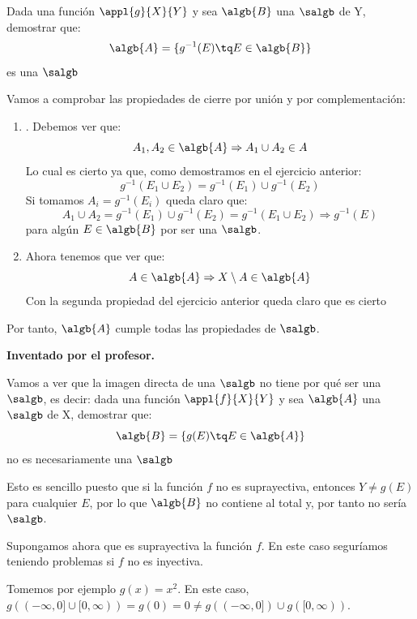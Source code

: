 \begin{problem}[5]
Dada una función $\appl{g}{X}{Y}$ y sea $\algb{B}$ una $\salgb$ de Y, demostrar que:
\[\algb{A}=\{g^{-1}(E) \tq E \in \algb{B}\}\]
es una $\salgb$

\solution
Vamos a comprobar las propiedades de cierre por unión y por complementación:
\begin{enumerate}
\item. Debemos ver que:
\[A_1, A_2\in \algb{A} \Rightarrow A_1 \cup A_2 \in A\]
Lo cual es cierto ya que, como demostramos en el ejercicio anterior:
\[g^{-1}(E_1 \cup E_2)=g^{-1}(E_1) \cup g^{-1}(E_2)\]
Si tomamos $A_i=g^{-1}(E_i)$ queda claro que:
\[A_1 \cup A_2 = g^{-1}(E_1) \cup g^{-1}(E_2) = g^{-1}(E_1\cup E_2) \Rightarrow g^{-1}(E)\]
para algún $E\in \algb{B}$ por ser una $\salgb$.

\item Ahora tenemos que ver que:
\[A \in \algb{A} \Rightarrow X\setminus A \in \algb{A}\]
Con la segunda propiedad del ejercicio anterior queda claro que es cierto
\end{enumerate}

Por tanto, $\algb{A}$ cumple todas las propiedades de $\salgb$.
\end{problem}

\begin{problem}[0-0]
\textbf{Inventado por el profesor.}

Vamos a ver que la imagen directa de una $\salgb$ no tiene por qué ser una $\salgb$, es decir:
dada una función $\appl{f}{X}{Y}$ y sea $\algb{A}$ una $\salgb$ de X, demostrar que:
\[\algb{B}=\{g(E) \tq E \in \algb{A}\}\]
no es necesariamente una $\salgb$

\solution
Esto es sencillo puesto que si la función $f$ no es suprayectiva, entonces $Y \neq g(E)$ para cualquier $E$, por lo que $\algb{B}$ no contiene al total y, por tanto no sería $\salgb$.

Supongamos ahora que es suprayectiva la función $f$. En este caso seguríamos teniendo problemas si $f$ no es inyectiva. 

Tomemos por ejemplo $g(x)=x^2$. En este caso, $g((-\infty, 0] \cup [0, \infty))=g(0)=0 \neq g((-\infty, 0]) \cup g([0, \infty))$.
\end{problem}

